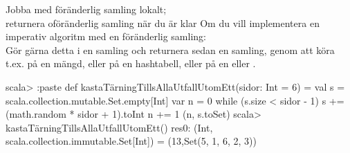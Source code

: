 \begin{Slide}{Jobba med föränderlig samling lokalt; \\ returnera oföränderlig samling när du är klar}
\SlideFontSmall
Om du vill implementera en imperativ algoritm med en föränderlig samling:\\ 
Gör gärna detta  i en  samling och returnera sedan en  samling, genom att köra t.ex.  på en mängd, eller  på en hashtabell, eller  på en  eller .

\begin{REPL}
scala> :paste
def kastaTärningTillsAllaUtfallUtomEtt(sidor: Int = 6) = {
  val s = scala.collection.mutable.Set.empty[Int]
  var n = 0
  while (s.size < sidor - 1) {
    s += (math.random * sidor + 1).toInt
    n += 1
  }
  (n, s.toSet)
}
scala> kastaTärningTillsAllaUtfallUtomEtt()
res0: (Int, scala.collection.immutable.Set[Int]) = (13,Set(5, 1, 6, 2, 3))

\end{REPL}

\end{Slide}
\fi






